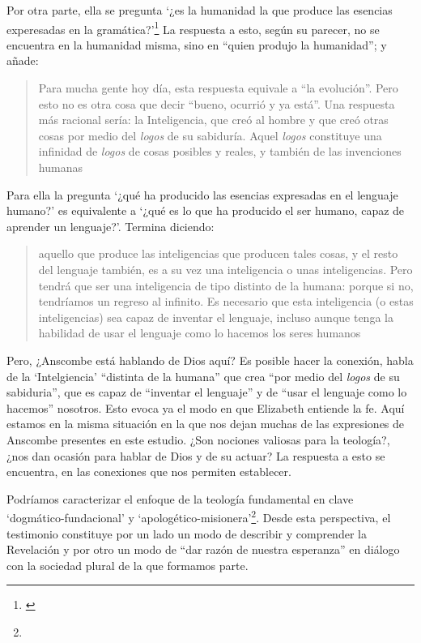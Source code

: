 Por otra parte, ella se pregunta \enquote*{¿es la humanidad la que produce las esencias experesadas en la gramática?}\footnote{\Cite[Cf.][72]{torralbaynubiola2005fayeh:esencia}} La respuesta a esto, según su parecer, no se encuentra en la humanidad misma, sino en \enquote{quien produjo la humanidad}; y añade: \blockquote[{\Cite[73]{torralbaynubiola2005fayeh:esencia}}]{Para mucha gente hoy día, esta respuesta equivale a ``la evolución''. Pero esto no es otra cosa que decir ``bueno, ocurrió y ya está''. Una respuesta más racional sería: la Inteligencia, que creó al hombre y que creó otras cosas por medio del \emph{logos} de su sabiduría. Aquel \emph{logos} constituye una infinidad de \emph{logos} de cosas posibles y reales, y también de las invenciones humanas}. Para ella la pregunta \enquote*{¿qué ha producido las esencias expresadas en el lenguaje humano?} es equivalente a \enquote*{¿qué es lo que ha producido el ser humano, capaz de aprender un lenguaje?}. Termina diciendo: \blockquote[{\Cite[74]{torralbaynubiola2005fayeh:esencia}}]{aquello que produce las inteligencias que producen tales cosas, y el resto del lenguaje también, es a su vez una inteligencia o unas inteligencias. Pero tendrá que ser una inteligencia de tipo distinto de la humana: porque si no, tendríamos un regreso al infinito. Es necesario que esta inteligencia (o estas inteligencias) sea capaz de inventar el lenguaje, incluso aunque tenga la habilidad de usar el lenguaje como lo hacemos los seres humanos}.

Pero, ¿Anscombe está hablando de Dios aquí? Es posible hacer la conexión, habla de la `Intelgiencia' ``distinta de la humana'' que crea ``por medio del \emph{logos} de su sabiduria'', que es capaz de ``inventar el lenguaje'' y de ``usar el lenguaje como lo hacemos'' nosotros. Esto evoca ya el modo en que Elizabeth entiende la fe. Aquí estamos en la misma situación en la que nos dejan muchas de las expresiones de Anscombe presentes en este estudio. ¿Son nociones valiosas para la teología?, ¿nos dan ocasión para hablar de Dios y de su actuar? La respuesta a esto se encuentra, en las conexiones que nos permiten establecer.

Podríamos caracterizar el enfoque de la teología fundamental en clave `dogmático-fundacional' y `apologético-misionera'\footnote{}. Desde esta perspectiva, el testimonio constituye por un lado un modo de describir y comprender la Revelación y por otro un modo de ``dar razón de nuestra esperanza'' en diálogo con la sociedad plural de la que formamos parte.

